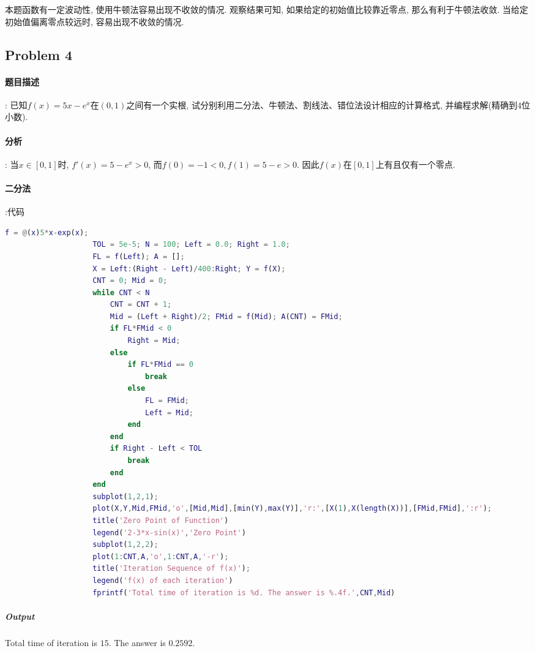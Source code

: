 \documentclass{article}
\begin{document}
\begin{CJK*}{UTF8}{song}
				本题函数有一定波动性, 使用牛顿法容易出现不收敛的情况. 观察结果可知, 如果给定的初始值比较靠近零点, 那么有利于牛顿法收敛. 当给定初始值偏离零点较远时, 容易出现不收敛的情况.
		\subsection{Problem 4}
			\paragraph{题目描述}
			:\newline
				已知$f\left(x\right) = 5x - e^x$在$\left(0,1\right)$之间有一个实根, 试分别利用二分法、牛顿法、割线法、错位法设计相应的计算格式, 并编程求解(精确到$4$位小数).
			
			\paragraph{分析}
			:\newline
				当$x \in \left[0,1 \right]$时, $f'\left(x\right) = 5 - e^x > 0$, 而$f\left(0 \right) = -1 < 0, f\left(1\right) = 5-e>0$. 因此$f\left(x\right)$在$\left[0,1 \right]$上有且仅有一个零点.
			
			\paragraph{二分法}
				:代码\newline
				\begin{lstlisting}[language=Matlab]
					f = @(x)5*x-exp(x);
					TOL = 5e-5; N = 100; Left = 0.0; Right = 1.0;
					FL = f(Left); A = [];
					X = Left:(Right - Left)/400:Right; Y = f(X);
					CNT = 0; Mid = 0;
					while CNT < N
						CNT = CNT + 1;
						Mid = (Left + Right)/2; FMid = f(Mid); A(CNT) = FMid;
						if FL*FMid < 0
							Right = Mid;
						else
							if FL*FMid == 0
								break
							else
								FL = FMid;
								Left = Mid;
							end
						end
						if Right - Left < TOL
							break
						end
					end
					subplot(1,2,1);
					plot(X,Y,Mid,FMid,'o',[Mid,Mid],[min(Y),max(Y)],'r:',[X(1),X(length(X))],[FMid,FMid],':r');
					title('Zero Point of Function')
					legend('2-3*x-sin(x)','Zero Point')
					subplot(1,2,2);
					plot(1:CNT,A,'o',1:CNT,A,'-r');
					title('Iteration Sequence of f(x)');
					legend('f(x) of each iteration')
					fprintf('Total time of iteration is %d. The answer is %.4f.',CNT,Mid)
				\end{lstlisting}
				\subparagraph{Output}
					Total time of iteration is $15$. The answer is $0.2592$.
					

\end{CJK*}
\end{document}
